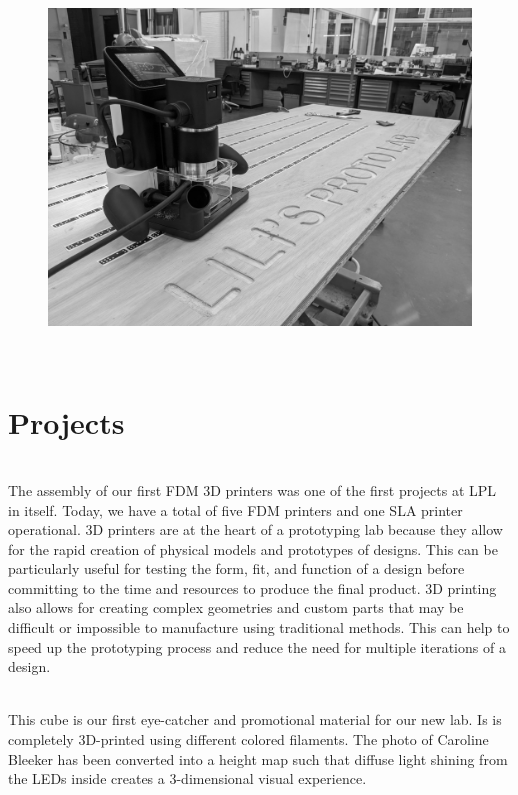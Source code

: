 \documentclass{report}
\newcommand\pagetitle{SectionTitle}
\newcommand{\LPLsection}[1]{%
\begin{figure}%
    \centering%
    \includegraphics[height=\textheight]{design_images/LPL_shaper.jpg}%
\end{figure}%
\clearpage%
\,\vspace{\textheight/3}%
\renewcommand\pagetitle{#1}%
\section*{\centering \pagetitle}%
\addcontentsline{toc}{section}{\protect\numberline{}\pagetitle}%
\clearpage%
}
\begin{document}
\LPLsection{Projects}

 \\

The assembly of our first FDM 3D printers was one of the first projects at LPL in itself. Today, we have a total of five FDM printers and one SLA printer operational. 
3D printers are at the heart of a prototyping lab because they allow for the rapid creation of physical models and prototypes of designs. This can be particularly useful for testing the form, fit, and function of a design before committing to the time and resources to produce the final product. 3D printing also allows for creating complex geometries and custom parts that may be difficult or impossible to manufacture using traditional methods. This can help to speed up the prototyping process and reduce the need for multiple iterations of a design. 

\clearpage
\begin{figure}
    \centering
\end{figure}
\clearpage

 \\

This cube is our first eye-catcher and promotional material for our new lab. Is is completely 3D-printed using different colored filaments. The photo of Caroline Bleeker has been converted into a height map such that diffuse light shining from the LEDs inside creates a 3-dimensional visual experience. 
\end{document}
